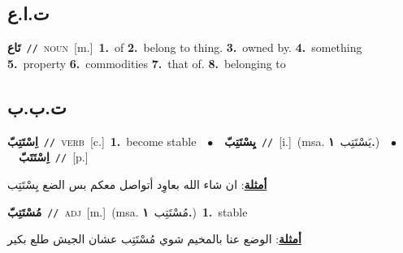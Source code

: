 \documentclass[10pt,a4paper,twoside]{article} %
\begin{document}
\begin{multicols}{2}
\vspace{-3mm}
\subsection*{\color{blue}\foreignlanguage{arabic}{ت.ا.ع}\color{blue}{ (ntws)}} 

{\setlength\topsep{0pt}\textbf{\foreignlanguage{arabic}{تَاع}}\ {\color{gray}\texttt{//}\color{black}}\ \textsc{noun}\ [m.]\ \textbf{1.}~of  \textbf{2.}~belong to thing.  \textbf{3.}~owned by.  \textbf{4.}~something  \textbf{5.}~property  \textbf{6.}~commodities  \textbf{7.}~that of.  \textbf{8.}~belonging to\ 

\vspace{-3mm}
\subsection*{\color{blue}\foreignlanguage{arabic}{ت.ب.ب}\color{blue}{}} 

{\setlength\topsep{0pt}\textbf{\foreignlanguage{arabic}{اِسْتَتِبّ}}\ {\color{gray}\texttt{//}\color{black}}\ \textsc{verb}\ [c.]\ \textbf{1.}~become stable\ \ $\bullet$\ \ \setlength\topsep{0pt}\textbf{\foreignlanguage{arabic}{يِسْتَتِبّ}}\ {\color{gray}\texttt{//}\color{black}}\ [i.]\ \color{gray}(msa. \foreignlanguage{arabic}{يَسْتَتِب}~\foreignlanguage{arabic}{\textbf{١.}})\color{black}\ \ $\bullet$\ \ \setlength\topsep{0pt}\textbf{\foreignlanguage{arabic}{اِسْتَتَبّ}}\ {\color{gray}\texttt{//}\color{black}}\ [p.]\  \begin{flushright}\color{gray}\foreignlanguage{arabic}{\textbf{\underline{\foreignlanguage{arabic}{أمثلة}}}: ان شاء الله بعاوِد أتواصل معكم بس الضع يِسْتَتِب}\end{flushright}\color{black}} \vspace{2mm}

{\setlength\topsep{0pt}\textbf{\foreignlanguage{arabic}{مُسْتَتِبّ}}\ {\color{gray}\texttt{//}\color{black}}\ \textsc{adj}\ [m.]\ \color{gray}(msa. \foreignlanguage{arabic}{مُسْتَتِب}~\foreignlanguage{arabic}{\textbf{١.}})\color{black}\ \textbf{1.}~stable\  \begin{flushright}\color{gray}\foreignlanguage{arabic}{\textbf{\underline{\foreignlanguage{arabic}{أمثلة}}}: الوضع عنا بالمخيم شوي مُسْتَتِب عشان الجيش طلع بكير}\end{flushright}\color{black}} \vspace{2mm}

}
\end{multicols}
\end{document}
